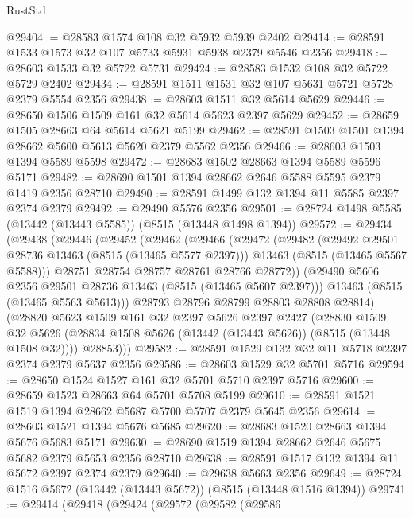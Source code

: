 \begin{lexlean}{RustStd}
\begin{coremodule}
@29404 := @28583 @1574 @108 @32 @5932 @5939 @2402
@29414 := @28591 @1533 @1573 @32 @107 @5733 @5931 @5938 @2379 @5546 @2356
@29418 := @28603 @1533 @32 @5722 @5731
@29424 := @28583 @1532 @108 @32 @5722 @5729 @2402
@29434 := @28591 @1511 @1531 @32 @107 @5631 @5721 @5728 @2379 @5554 @2356
@29438 := @28603 @1511 @32 @5614 @5629
@29446 := @28650 @1506 @1509 @161 @32 @5614 @5623 @2397 @5629
@29452 := @28659 @1505 @28663 @64 @5614 @5621 @5199
@29462 := @28591 @1503 @1501 @1394 @28662 @5600 @5613 @5620 @2379 @5562 @2356
@29466 := @28603 @1503 @1394 @5589 @5598
@29472 := @28683 @1502 @28663 @1394 @5589 @5596 @5171
@29482 := @28690 @1501 @1394 @28662 @2646 @5588 @5595 @2379 @1419 @2356 @28710
@29490 := @28591 @1499 @132 @1394 @11 @5585 @2397 @2374 @2379
@29492 := @29490 @5576 @2356
@29501 := @28724 @1498 @5585 (@13442 (@13443 @5585)) (@8515 (@13448 @1498 @1394))
@29572 := @29434
    (@29438
      (@29446
        (@29452
          (@29462
            (@29466
              (@29472
                (@29482
                  (@29492 @29501 @28736 @13463 (@8515 (@13465 @5577 @2397)))
                  @13463
                  (@8515 (@13465 @5567 @5588)))
                @28751
                @28754
                @28757
                @28761
                @28766
                @28772))
            (@29490 @5606 @2356 @29501 @28736 @13463 (@8515 (@13465 @5607 @2397)))
            @13463
            (@8515 (@13465 @5563 @5613)))
          @28793
          @28796
          @28799
          @28803
          @28808
          @28814)
        (@28820
          @5623
          @1509
          @161
          @32
          @2397
          @5626
          @2397
          @2427
          (@28830
            @1509
            @32
            @5626
            (@28834 @1508 @5626 (@13442 (@13443 @5626)) (@8515 (@13448 @1508 @32))))
          @28853)))
@29582 := @28591 @1529 @132 @32 @11 @5718 @2397 @2374 @2379 @5637 @2356
@29586 := @28603 @1529 @32 @5701 @5716
@29594 := @28650 @1524 @1527 @161 @32 @5701 @5710 @2397 @5716
@29600 := @28659 @1523 @28663 @64 @5701 @5708 @5199
@29610 := @28591 @1521 @1519 @1394 @28662 @5687 @5700 @5707 @2379 @5645 @2356
@29614 := @28603 @1521 @1394 @5676 @5685
@29620 := @28683 @1520 @28663 @1394 @5676 @5683 @5171
@29630 := @28690 @1519 @1394 @28662 @2646 @5675 @5682 @2379 @5653 @2356 @28710
@29638 := @28591 @1517 @132 @1394 @11 @5672 @2397 @2374 @2379
@29640 := @29638 @5663 @2356
@29649 := @28724 @1516 @5672 (@13442 (@13443 @5672)) (@8515 (@13448 @1516 @1394))
@29741 := @29414
    (@29418
      (@29424
        (@29572
          (@29582
            (@29586

\end{coremodule}
\end{lexlean}
